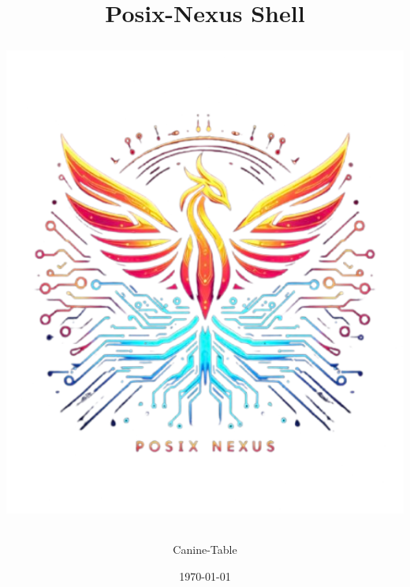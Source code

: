 \documentclass[a4paper,12pt]{article}
\begin{document}
	\label{top}
	\title{
		\hspace{48px}\textbf{Posix-Nexus Shell}\\[10mm]
		\begin{NexMainBox}[dark, shpA,fit, width=\linewidth/2]
			\includegraphics[width=\textwidth]{img/posix-nexus.png}
		\end{NexMainBox}
	}
	\author{Canine-Table}
	\date{\today}
	\maketitle
	\newpage
	\begin{NexMainBox}[light, title=Contents, hdrB, breakable]
		\thispagestyle{plain}
		\tableofcontents
	\end{NexMainBox}
	\newpage
	
	
	
	
	
	
	
	
	
	
	
	
\end{document}

